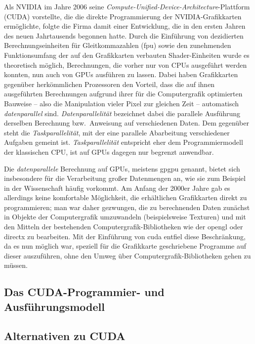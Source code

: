 Als NVIDIA{\textregistered} im Jahre 2006 seine \textit{Compute-Unified-Device-Architecture}-Plattform
(CUDA{\textregistered}) vorstellte, die die direkte Programmierung der NVIDIA{\textregistered}-Grafikkarten ermöglichte,
folgte die Firma damit einer Entwicklung, die in den ersten Jahren des neuen Jahrtausends begonnen hatte. Durch die
Einführung von dezidierten Berechnungseinheiten für Gleitkommazahlen (\gls{fpu}) sowie den zunehmenden Funktionsumfang
der auf den Grafikkarten verbauten Shader-Einheiten wurde es theoretisch möglich, Berechnungen, die vorher nur von CPUs
ausgeführt werden konnten, nun auch von GPUs ausführen zu lassen. Dabei haben Grafikkarten gegenüber herkömmlichen
Prozessoren den Vorteil, dass die auf ihnen ausgeführten Berechnungen aufgrund ihrer für die Computergrafik optimierten
Bauweise -- also die Manipulation vieler Pixel zur gleichen Zeit -- automatisch \textit{datenparallel} sind. 
\textit{Datenparallelität} bezeichnet dabei die parallele Ausführung derselben Berechnung bzw.\ Anweisung auf
verschiedenen Daten. Dem gegenüber steht die \textit{Taskparallelität}, mit der eine parallele Abarbeitung verschiedener
Aufgaben gemeint ist. \textit{Taskparallelität} entspricht eher dem Programmiermodell der klassischen CPU, ist auf GPUs
dagegen nur begrenzt anwendbar.

Die \textit{datenparallele} Berechnung auf GPUs, meistens \gls{gpgpu} genannt, bietet sich insbesondere
für die Verarbeitung großer Datenmengen an, wie sie zum Beispiel in der Wissenschaft häufig vorkommt. Am Anfang der
2000er Jahre gab es allerdings keine komfortable Möglichkeit, die erhältlichen Grafikkarten direkt zu programmieren;
man war daher gezwungen, die zu berechnenden Daten zunächst in Objekte der Computergrafik umzuwandeln (beispielsweise 
Texturen) und mit den Mitteln der bestehenden Computergrafik-Bibliotheken wie der \gls{opengl} oder \gls{directx} zu
bearbeiten. Mit der Einführung von \gls{cuda} entfiel diese Beschränkung, da es nun möglich war, speziell für die
Grafikkarte geschriebene Programme auf dieser auszuführen, ohne den Umweg über Computergrafik-Bibliotheken gehen zu
müssen.

\subsection{Das CUDA{\textregistered}-Programmier- und Ausführungsmodell}

\subsection{Alternativen zu CUDA{\textregistered}}

